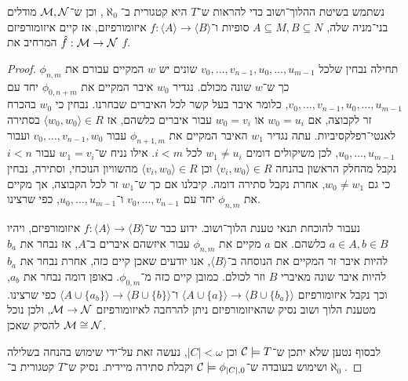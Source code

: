 \subquestion{}
נשתמש בשיטת ההלוך־ושוב כדי להראות ש־$T$ היא קטגורית ב־$\aleph_0$,
וכן ש־$\mathcal{M}, \mathcal{N}$ מודלים בני־מניה שלה, $A \subseteq M, B \subseteq N$ סופיות ו־$f : \langle A \rangle \to \langle B \rangle$ איזומורפיזם, אז קיים איזומורפיזם $\hat{f} : \mathcal{M} \to \mathcal{N}$ המרחיב את $f$.
\begin{proof}
	תחילה נבחין שלכל $v_0, \dots, v_{n - 1}, u_0, \dots, u_{m - 1}$ שונים יש $w$ המקיים עבורם את $\phi_{n, m}$ כך ש־$w$ שונה מכולם.
	נגדיר $w_0$ איבר המקיים את $\phi_{0, n + m}$ יחד עם $v_0, \dots, v_{n - 1}, u_0, \dots, u_{m - 1}$, כלומר איבר בעל קשר לכל האיברים שבחרנו.
	נבחין כי $w_0$ בהכרח זר לקבוצה, אם $w_0 = u_i$ או $w_0 = v_i$ עבור איברים כלשהם, אז $\langle w_0, w_0 \rangle \in R$ בסתירה לאנטי־רפלקסיביות.
	עתה נגדיר $w_1$ האיבר המקיים את $\phi_{n + 1, m}$ עבור $v_0, \dots, v_{n - 1}, w_0$ ועבור $u_0, \dots, u_{m - 1}$, לכן משיקולים דומים $w_1 \ne u_i$ לכל $i < m$.
	אילו נניח ש־$w_1 = v_i$ עבור $i < n$ נקבל מהחלק הראשון בהנחה $\langle v_i, w_0 \rangle \in R$ וכן $\langle v_i, w_0 \rangle \in R$ מהשוויון הנוכחי, וסתירה, נבחין כי גם $w_0 \ne w_1$, אחרת נקבל סתירה דומה.
	קיבלנו אם כך ש־$w_1$ זר לכל הקבוצה, אך מקיים את $\phi_{n, m}$ יחד עם $v_0, \dots, v_{n - 1}$ ו־$u_0, \dots, u_{m - 1}$, כפי שרצינו.

	נעבור להוכחת תנאי טענת הלוך־ושוב. ידוע כבר ש־$f : \langle A \rangle \to \langle B \rangle$ איזומורפיזם, ויהיו $a \in A, b \in B$ כלשהם.
	אם $a$ מקיים את $\phi_{n, m}$ עבור איזשהם איברים ב־$A$, אז נבחר את $b_a$ להיות איבר זר המקיים את הנוסחה ב־$\langle B \rangle$, אנו יודעים שאכן קיים כזה, אחרת נבחר את $b_a$ להיות איבר שונה מאיברי $B$ וזר לכולם.
	כמובן קיים כזה מ־$\phi_{0, m}$.
	באופן דומה נבחר את $a_b$, וכך נקבל איזומורפיזם $\langle A \cup \{ a \} \rangle \to \langle B \cup \{ b_a \} \rangle$ ו־$\langle A \cup \{ a_b \} \rangle \to \langle B \cup \{ b \} \rangle$ כפי שרצינו.
	מטענת הלוך ושוב נסיק שהאיזומורפיזם ניתן להרחבה לאיזומורפיזם $\mathcal{M} \to \mathcal{N}$, ולכן נוכל להסיק שאכן $\mathcal{M} \cong \mathcal{N}$.

	לבסוף נטען שלא יתכן ש־$\mathcal{C} \models T$ וכן $|C| < \omega$, נעשה זאת על־ידי שימוש בהנחה בשלילה ושימוש בעובדה ש־$\mathcal{C} \models \phi_{|C|, 0}$ וקבלת סתירה מיידית.
	נסיק ש־$T$ קטגורית ב־$\aleph_0$.
\end{proof}

